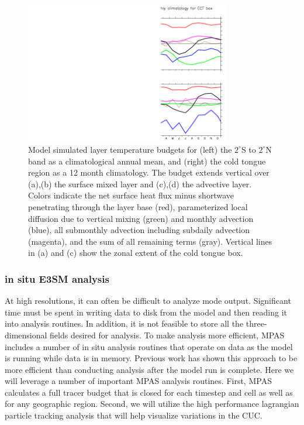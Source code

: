 \begin{figure}[h]
  \centering
  \includegraphics[width=0.8\textwidth]{heatbudget.png}
  \caption{Model simulated layer temperature budgets for (left) the $2^\circ$S to $2^\circ$N band as a climatological annual mean, and (right) the cold tongue region as a 12 month climatology.  The budget extends vertical over (a),(b) the surface mixed layer and (c),(d) the advective layer.  Colors indicate the net surface heat flux minus shortwave penetrating through the layer base (red), parameterized local diffusion due to vertical mixing (green) and monthly advection (blue), all submonthly advection including subdaily advection (magenta), and the sum of all remaining terms (gray).  Vertical lines in (a) and (c) show the zonal extent of the cold tongue box.}
  \label{fig:heatBudget}
\end{figure}

\subsubsection{in situ E3SM analysis}
At high resolutions, it can often be difficult to analyze mode output.  Significant time must be spent in writing data to disk from the model and then reading it into analysis routines.  In addition, it is not feasible to store all the three-dimensional fields desired for analysis.  To make analysis more efficient, MPAS includes a number of in situ analysis routines that operate on data as the model is running while data is in memory.  Previous work \citep{woodring2015situ} has shown this approach to be more efficient than conducting analysis after the model run is complete.  Here we will leverage a number of important MPAS analysis routines.  First, MPAS calculates a full tracer budget that is closed for each timestep and cell as well as for any geographic region.  Second, we will utilize the high performance lagrangian particle tracking analysis \citep{wolfram2015diagnosing} that will help visualize variations in the CUC.

